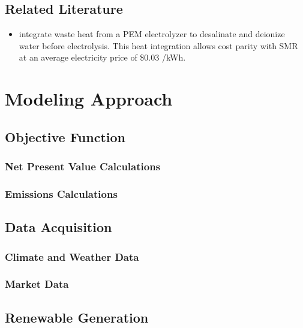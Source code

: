 \documentclass[preprint,12pt]{elsarticle}
\begin{document}
\subsection{Related Literature}
\label{sub:literature}

\begin{itemize}
    \item \citet{Ginsberg2022} integrate waste heat from a PEM electrolyzer to desalinate and deionize water before electrolysis. This heat integration allows cost parity with SMR at an average electricity price of \$0.03 /kWh.
\end{itemize}

\section{Modeling Approach}
\label{sec:modeling}

\subsection{Objective Function}
\label{sub:objective}

\subsubsection{Net Present Value Calculations}
\label{sub:npv}

\subsubsection{Emissions Calculations}
\label{sub:emissions}

\subsection{Data Acquisition}
\label{sub:data}

\subsubsection{Climate and Weather Data}
\label{sub:weather}

\subsubsection{Market Data}
\label{sub:market}

\subsection{Renewable Generation}
\label{sub:generation}
\end{document}
